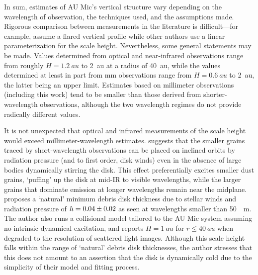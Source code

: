 \documentclass[modern]{aastex62}
\begin{document}
In sum, estimates of AU Mic's vertical structure vary depending on the wavelength of observation, the techniques used, and the assumptions made.
Rigorous comparison between measurements in the literature is difficult---for example, \cite{krist05} assume a flared vertical profile while other authors use a linear parameterization for the scale height.
Nevertheless, some general statements may be made.
Values determined from optical and near-infrared observations range from roughly $H = \SI{1.2}{au}$ to \SI{2}{au} at a radius of \SI{40}{au}, while the values determined at least in part from mm observations range from $H = \SI{0.6}{au}$ to \SI{2}{au}, the latter being an upper limit. 
Estimates based on millimeter observations (including this work) tend to be smaller than those derived from shorter-wavelength observations, although the two wavelength regimes do not provide radically different values.

It is not unexpected that optical and infrared measurements of the scale height would exceed millimeter-wavelength estimates.
\cite{thebault09} suggests that the smaller grains traced by short-wavelength observations can be placed on inclined orbits by radiation pressure (and to first order, disk winds) even in the absence of large bodies dynamically stirring the disk. 
This effect preferentially excites smaller dust grains, `puffing' up the disk at mid-IR to visible wavelengths, while the larger grains that dominate emission at longer wavelengths remain near the midplane.
\cite{thebault09} proposes a `natural' minimum debris disk thickness due to stellar winds and radiation pressure of $h = \num{0.04 \pm 0.02}$ as seen at wavelengths smaller than \SI{50}{\mu \meter}.
The author also runs a collisional model tailored to the AU Mic system assuming no intrinsic dynamical excitation, and reports $H = \SI{1}{au}$ for $r \leq \SI{40}{au}$ when degraded to the resolution of scattered light images.
Although this scale height falls within the range of `natural' debris disk thicknesses, the author stresses that this does not amount to an assertion that the disk is dynamically cold due to the simplicity of their model and fitting process.
\end{document}
